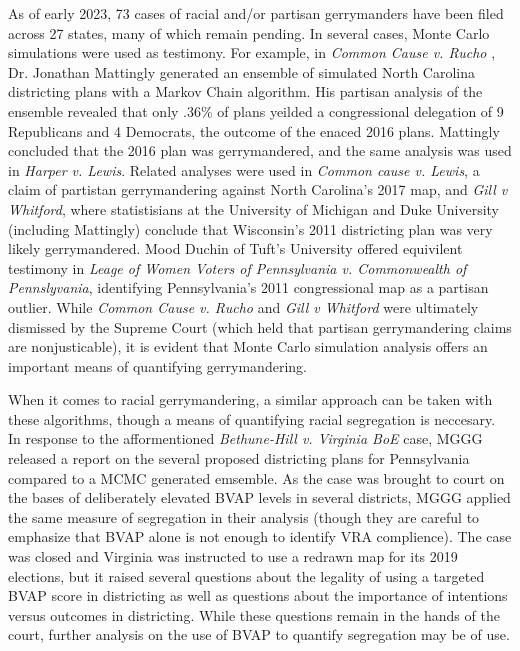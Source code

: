 \documentclass{article}
\begin{document}
\par
As of early 2023, 73 cases of racial and/or partisan gerrymanders have been filed across 27 states, many of which remain pending. In several cases, Monte Carlo simulations were used as testimony. For example, in \emph{Common Cause v. Rucho} \cite{RuchoCommom}, Dr. Jonathan Mattingly generated an ensemble of simulated North Carolina districting plans with a Markov Chain algorithm. His partisan analysis of the ensemble revealed that only .36\% of plans yeilded a congressional delegation of 9 Republicans and 4 Democrats, the outcome of the enaced 2016 plans. Mattingly concluded that the 2016 plan was gerrymandered,  and the same analysis was used in \emph{Harper v. Lewis}\cite{Harper}. Related analyses were used in \emph{Common cause v. Lewis}\cite{Lewis}, a claim of partistan gerrymandering against North Carolina's 2017 map, and \emph{Gill v Whitford}\cite{GillWhitford}, where statistisians at the University of Michigan and Duke University (including Mattingly) conclude that Wisconsin's 2011 districting plan was very likely gerrymandered. Mood Duchin of Tuft's University offered equivilent testimony in \emph{Leage of Women Voters of Pennsylvania v. Commonwealth of Pennslyvania}\cite{LeaguePA}, identifying Pennsylvania's 2011 congressional map as a partisan outlier\cite{VAREPORT}. While \emph{Common Cause v. Rucho}\cite{RuchoCommom} and \emph{Gill v Whitford}\cite{GillWhitford} were ultimately dismissed by the Supreme Court (which held that partisan gerrymandering claims are nonjusticable), it is evident that Monte Carlo simulation analysis offers an important means of quantifying gerrymandering.  
\par 
When it comes to racial gerrymandering, a similar approach can be taken with these algorithms, though a means of quantifying racial segregation is neccesary. In response to the afformentioned \emph{Bethune-Hill v. Virginia BoE}\cite{Bethune} case, MGGG released a report on the several proposed districting plans for Pennsylvania compared to a MCMC generated emsemble. As the case was brought to court on the bases of deliberately elevated BVAP levels in several districts, MGGG applied the same measure of segregation in their analysis (though they are careful to emphasize that BVAP alone is not enough to identify VRA complience). The case was closed and Virginia was instructed to use a redrawn map for its 2019 elections, but it raised several questions about the legality of using a targeted BVAP score in districting as well as questions about the importance of intentions versus outcomes in districting. While these questions remain in the hands of the court, further analysis on the use of BVAP to quantify segregation may be of use.
\end{document}
